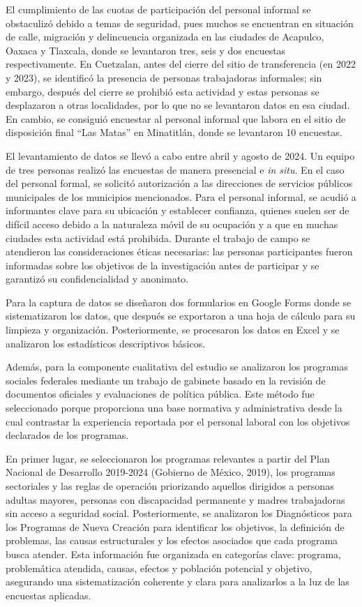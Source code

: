 \documentclass[
  spanish,
  11.5pt,
  170mm x 240mmpaper,
]{scrbook}
\begin{document}
El cumplimiento de las cuotas de participación del personal informal se
obstaculizó debido a temas de seguridad, pues muchos se encuentran en
situación de calle, migración y delincuencia organizada en las ciudades
de Acapulco, Oaxaca y Tlaxcala, donde se levantaron tres, seis y dos
encuestas respectivamente. En Cuetzalan, antes del cierre del sitio de
transferencia (en 2022 y 2023), se identificó la presencia de personas
trabajadoras informales; sin embargo, después del cierre se prohibió
esta actividad y estas personas se desplazaron a otras localidades, por
lo que no se levantaron datos en esa ciudad. En cambio, se consiguió
encuestar al personal informal que labora en el sitio de disposición
final ``Las Matas'' en Minatitlán, donde se levantaron 10 encuestas.

El levantamiento de datos se llevó a cabo entre abril y agosto de 2024.
Un equipo de tres personas realizó las encuestas de manera presencial e
\emph{in situ}. En el caso del personal formal, se solicitó autorización
a las direcciones de servicios públicos municipales de los municipios
mencionados. Para el personal informal, se acudió a informantes clave
para su ubicación y establecer confianza, quienes suelen ser de difícil
acceso debido a la naturaleza móvil de su ocupación y a que en muchas
ciudades esta actividad está prohibida. Durante el trabajo de campo se
atendieron las consideraciones éticas necesarias: las personas
participantes fueron informadas sobre los objetivos de la investigación
antes de participar y se garantizó su confidencialidad y anonimato.

Para la captura de datos se diseñaron dos formularios en Google Forms
donde se sistematizaron los datos, que después se exportaron a una hoja
de cálculo para su limpieza y organización. Posteriormente, se
procesaron los datos en Excel y se analizaron los estadísticos
descriptivos básicos.

Además, para la componente cualitativa del estudio se analizaron los
programas sociales federales mediante un trabajo de gabinete basado en
la revisión de documentos oficiales y evaluaciones de política pública.
Este método fue seleccionado porque proporciona una base normativa y
administrativa desde la cual contrastar la experiencia reportada por el
personal laboral con los objetivos declarados de los programas.

En primer lugar, se seleccionaron los programas relevantes a partir del
Plan Nacional de Desarrollo 2019-2024 (Gobierno de México, 2019), los
programas sectoriales y las reglas de operación priorizando aquellos
dirigidos a personas adultas mayores, personas con discapacidad
permanente y madres trabajadoras sin acceso a seguridad social.
Posteriormente, se analizaron los Diagnósticos para los Programas de
Nueva Creación para identificar los objetivos, la definición de
problemas, las causas estructurales y los efectos asociados que cada
programa busca atender. Esta información fue organizada en categorías
clave: programa, problemática atendida, causas, efectos y población
potencial y objetivo, asegurando una sistematización coherente y clara
para analizarlos a la luz de las encuestas aplicadas.
\end{document}

